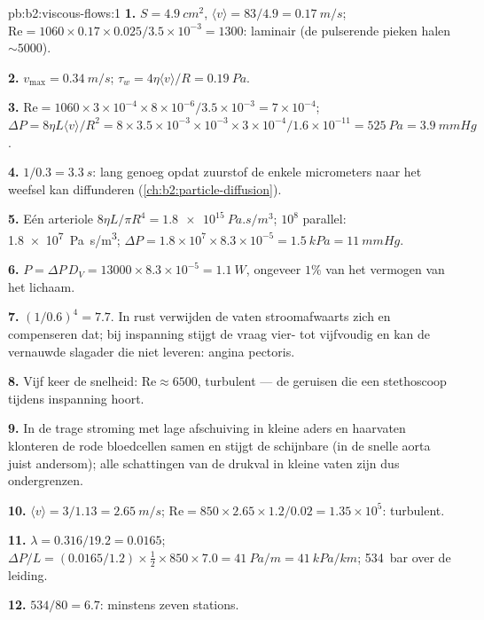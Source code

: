 \begin{solution}{pb:b2:viscous-flows:1}
\textbf{1.} $S = \qty{4.9}{cm^2}$,
$\langle v\rangle = 83/4.9 = \qty{0.17}{m/s}$;
$\mathrm{Re}
= 1060 \times 0.17 \times 0.025/3.5 \times 10^{-3} = 1300$:
laminair (de pulserende pieken halen $\sim 5000$).

\textbf{2.} $v_{\max} = \qty{0.34}{m/s}$;
$\tau_w = 4\eta\langle v\rangle/R = \qty{0.19}{Pa}$.

\textbf{3.}
$\mathrm{Re} = 1060 \times 3 \times 10^{-4} \times 8 \times 10^{-6}/3.5 \times 10^{-3} =
7 \times 10^{-4}$;
$\Delta P = 8\eta L\langle v\rangle/R^2 = 8 \times 3.5 \times 10^{-3} \times 10^{-3}
\times 3 \times 10^{-4}/1.6 \times 10^{-11} = \qty{525}{Pa} = \qty{3.9}{mmHg}$.

\textbf{4.} $1/0.3 = \qty{3.3}{s}$: lang genoeg opdat zuurstof de enkele
micrometers naar het weefsel kan diffunderen
(\cref{ch:b2:particle-diffusion}).

\textbf{5.} Eén arteriole $8\eta L/\pi R^4 = \qty{1.8e15}{Pa.s/m^3}$; $10^8$
parallel: \qty{1.8e7}{Pa.s/m^3};
$\Delta P = 1.8 \times 10^7 \times 8.3 \times 10^{-5} =
\qty{1.5}{kPa} = \qty{11}{mmHg}$.

\textbf{6.}
$P = \Delta P\,D_V = 13000 \times 8.3 \times 10^{-5} = \qty{1.1}{W}$,
ongeveer $1\%$ van het vermogen van het lichaam.

\textbf{7.} $(1/0.6)^4 = 7.7$. In rust verwijden de vaten stroomafwaarts
zich en compenseren dat; bij inspanning stijgt de vraag vier- tot vijfvoudig
en kan de vernauwde slagader die niet leveren: angina pectoris.

\textbf{8.} Vijf keer de snelheid: $\mathrm{Re} \approx 6500$, turbulent ---
de geruisen die een stethoscoop tijdens inspanning hoort.

\textbf{9.} In de trage stroming met lage afschuiving in kleine aders en
haarvaten klonteren de rode bloedcellen samen en stijgt de schijnbare
 (in de snelle aorta juist andersom); alle schattingen van de
drukval in kleine vaten zijn dus ondergrenzen.

\textbf{10.} $\langle v\rangle = 3/1.13 = \qty{2.65}{m/s}$;
$\mathrm{Re} = 850 \times 2.65 \times
1.2/0.02 = 1.35 \times 10^5$:
turbulent.

\textbf{11.} $\lambda = 0.316/19.2 = 0.0165$;
$\Delta P/L = (0.0165/1.2) \times \tfrac12 \times
850 \times 7.0 = \qty{41}{Pa/m} = \qty{41}{kPa/km}$;
\qty{534}{bar} over de leiding.

\textbf{12.} $534/80 = 6.7$: minstens zeven stations.


\end{solution}
